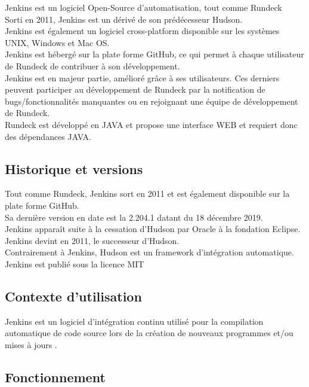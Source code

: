 \documentclass[12pt]{article}
\begin{document}
Jenkins est un logiciel Open-Source d'automatisation, tout comme Rundeck
\\
Sorti en 2011, Jenkins est un dérivé de son prédécesseur Hudson.
\\
Jenkins est également un logiciel cross-platform disponible sur les systèmes UNIX, Windows et Mac OS. 
\\
Jenkins est hébergé sur la plate forme GitHub, ce qui permet à chaque utilisateur de Rundeck de contribuer à son développement. 
\\
Jenkins est en majeur partie, amélioré grâce à ses utilisateurs. Ces derniers peuvent participer au développement de Rundeck par la notification de bugs/fonctionnalités manquantes ou en rejoignant une équipe de développement de Rundeck. 
\\
Rundeck est développé en JAVA et propose une interface WEB et requiert donc des dépendances JAVA.

\subsection{Historique et versions}

Tout comme Rundeck, Jenkins sort en 2011 et est également disponible sur la plate forme GitHub.
\\
Sa dernière version en date est la 2.204.1 datant du 18 décembre 2019.
\\
Jenkins apparaît suite à la cessation d'Hudson par Oracle à la fondation Eclipse. Jenkins devint en 2011, le successeur d'Hudson.
\\
Contrairement à Jenkins, Hudson est un framework d'intégration automatique.
\\
Jenkins est publié sous la licence MIT

\subsection{Contexte d'utilisation}

Jenkins est un logiciel d'intégration continu utilisé pour la compilation automatique de code source lors de la création de nouveaux programmes et/ou mises à jours .

\subsection{Fonctionnement}
\end{document}
